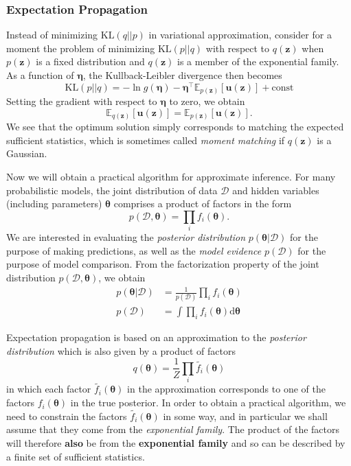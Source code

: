 \documentclass[a4paper]{report}
\newcommand{\ud}{\mathrm{d}}
\newcommand{\up}{\mathrm}
\renewcommand{\bf}{\mathbf}
\renewcommand{\cal}{\mathcal}
\newcommand{\bb}{\mathbb}
\newcommand{\imp}[1]{{\color{blue}\textit{#1}}}
\newcommand{\bs}{\boldsymbol}
\begin{document}
\subsubsection{Expectation Propagation}
Instead of minimizing $\up{KL}(q||p)$ in variational approximation, consider for a moment the problem of minimizing $\up{KL}(p||q)$ with respect to $q(\bf{z})$ when $p(\bf{z})$ is a fixed distribution and $q(\bf{z})$ is a member of the exponential family. As a function of $\bs{\eta}$, the Kullback-Leibler divergence then becomes
\begin{equation}
	\up{KL}(p||q) = -\ln g(\bs{\eta}) - \bs{\eta}^{\intercal} \bb{E}_{p(\bf{z})}[\bf{u(z)}] + \up{const}
\end{equation}
Setting the gradient with respect to $\bs{\eta}$ to zero, we obtain
\begin{equation}
	\bb{E}_{q(\bf{z})}[\bf{u(z)}] = \bb{E}_{p(\bf{z})}[\bf{u(z)}].
\end{equation}
We see that the optimum solution simply corresponds to matching the expected sufficient statistics, which is sometimes called \imp{moment matching} if $q(\bf{z})$ is a Gaussian.

Now we will obtain a practical algorithm for approximate inference. For many probabilistic models, the joint distribution of data $\cal{D}$ and hidden variables (including parameters) $\bs{\theta}$ comprises a product of factors in the form
\begin{equation}
	p(\cal{D},\bs{\theta}) = \prod_i f_i(\bs{\theta}).
\end{equation}
We are interested in evaluating the \imp{posterior distribution} $p(\bs{\theta}|\cal{D})$ for the purpose of making predictions, as well as the \imp{model evidence} $p(\cal{D})$ for the purpose of model comparison. From the factorization property of the joint distribution $p(\cal{D},\bs{\theta})$, we obtain
\begin{align}
	p(\bs{\theta}|\cal{D}) &= \frac{1}{p(\cal{D})} \prod_i f_i(\bs{\theta}) \\
	p(\cal{D}) &= \int \prod_i f_i(\bs{\theta}) \ud \bs{\theta}
\end{align}

Expectation propagation is based on an approximation to the \imp{posterior distribution} which is also given by a product of factors
\begin{equation}
	q(\bs{\theta}) = \frac{1}{Z} \prod_i \tilde{f_i}(\bs{\theta})
\end{equation}
in which each factor $\tilde{f_i}(\bs{\theta})$ in the approximation corresponds to one of the factors $f_i(\bs{\theta})$ in the true posterior. In order to obtain a practical algorithm, we need to constrain the factors $\tilde{f_i}(\bs{\theta})$ in some way, and in particular we shall assume that they come from the \emph{exponential family}. The product of the factors will therefore \textbf{also} be from the \textbf{exponential family} and so can be described by a finite set of sufficient statistics. 
\end{document}
